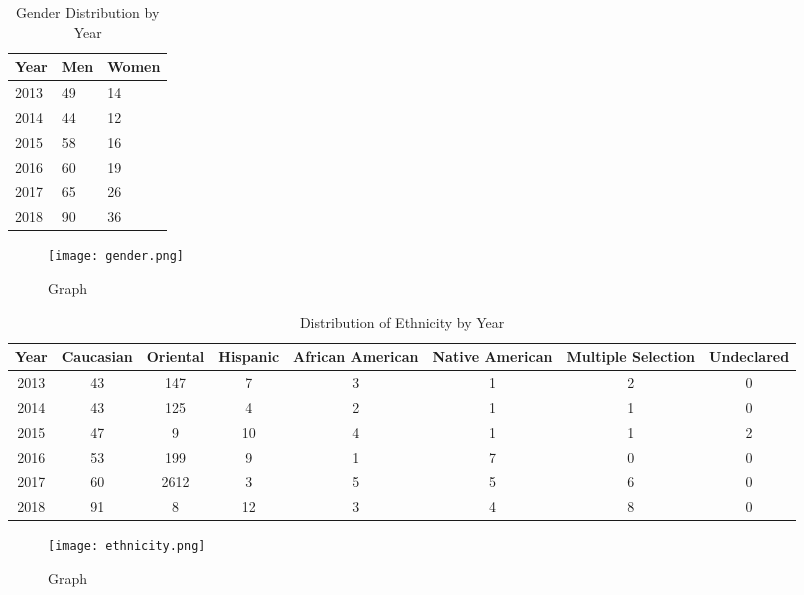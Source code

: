 \documentclass{article}
\begin{document}
\begin{table}[H]
\centering
\caption{Gender Distribution by Year}
\label{Gender}
\begin{tabular}{l|l|l}
Year & Men & Women \\ \hline
2013 & 49  & 14    \\ \hline
2014 & 44  & 12    \\ \hline
2015 & 58  & 16    \\ \hline
2016 & 60  & 19    \\ \hline
2017 & 65  & 26    \\ \hline
2018 & 90  & 36   
\end{tabular}
\end{table}

\begin{figure}[H]
\centering
\texttt{[image: gender.png]}
\caption{Graph}
\label{fig:Gender}
\end{figure}

\begin{table}[H]
\centering
\caption{Distribution of Ethnicity by Year}
\label{Ethnicity}
\begin{tabular}{c|c|c|c|c|c|c|c}
Year & Caucasian & Oriental & Hispanic & African American & Native American & Multiple Selection & Undeclared \\ \hline
2013 & 43        & 147      & 7        & 3                & 1               & 2                  & 0          \\ \hline
2014 & 43        & 125      & 4        & 2                & 1               & 1                  & 0          \\ \hline
2015 & 47        & 9        & 10       & 4                & 1               & 1                  & 2          \\ \hline
2016 & 53        & 199      & 9        & 1                & 7               & 0                  & 0          \\ \hline
2017 & 60        & 2612     & 3        & 5                & 5               & 6                  & 0          \\ \hline
2018 & 91        & 8        & 12       & 3                & 4               & 8                  & 0         
\end{tabular}
\end{table}

\begin{figure}[H]
\centering
\texttt{[image: ethnicity.png]}
\caption{Graph}
\label{fig:Ethnicity}
\end{figure}
\end{document}

